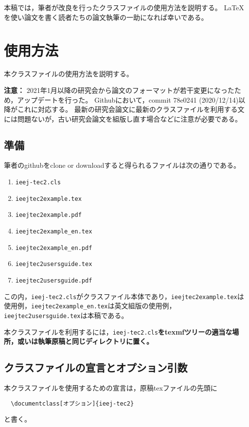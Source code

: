 \documentclass[fleqn]{ieej-tec2}%
\begin{document}
本稿では，筆者が改良を行ったクラスファイルの使用方法を説明する。
\LaTeX{}を使い論文を書く読者たちの論文執筆の一助になれば幸いである。

\section{使用方法}
本クラスファイルの使用方法を説明する。

\textbf{注意：} 2021年1月以降の研究会から論文のフォーマットが若干変更になった\cite{IEEJformat2021}ため，アップデートを行った。
Githubにおいて，commit 78e0241 (2020/12/14)以降がこれに対応する。
最新の研究会論文に最新のクラスファイルを利用する文には問題ないが，古い研究会論文を組版し直す場合などに注意が必要である。

\subsection{準備}
筆者のgithubをclone or downloadすると得られるファイルは次の通りである。
\begin{enumerate}
    \item \texttt{ieej-tec2.cls}
    \item \texttt{ieejtec2example.tex}
    \item \texttt{ieejtec2example.pdf}
    \item \texttt{ieejtec2example\_en.tex}
    \item \texttt{ieejtec2example\_en.pdf}
    \item \texttt{ieejtec2usersguide.tex}
    \item \texttt{ieejtec2usersguide.pdf}
\end{enumerate}
この内，\texttt{ieej-tec2.cls}がクラスファイル本体であり，\texttt{ieejtec2example.tex}は使用例，\texttt{ieejtec2example\_en.tex}は英文組版の使用例，\texttt{ieejtec2usersguide.tex}は本稿である。

本クラスファイルを利用するには，\texttt{ieej-tec2.cls}\textbf{をtexmfツリーの適当な場所，或いは執筆原稿と同じディレクトリに置く。}

\subsection{クラスファイルの宣言とオプション引数}
本クラスファイルを使用するための宣言は，原稿texファイルの先頭に
\begin{verbatim}
  \documentclass[オプション]{ieej-tec2}
\end{verbatim}
と書く。
\end{document}

